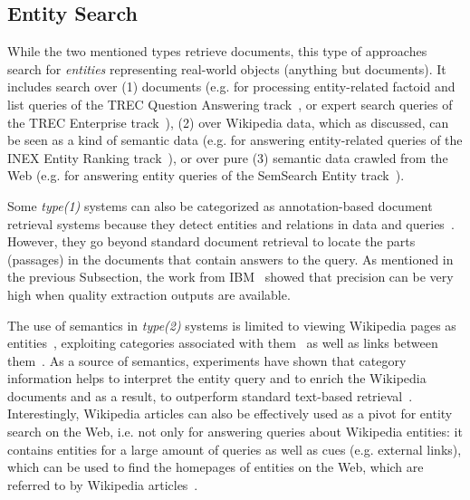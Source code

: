 \subsection{Entity Search} While the two mentioned types retrieve documents, this type of approaches search for \emph{entities} representing real-world objects (anything but documents). It includes search over (1) documents (e.g. for processing entity-related factoid and list queries of the TREC Question Answering track~\cite{DBLP:conf/sigir/Chu-CarrollPCFD06}, or expert search queries of the TREC Enterprise track~\cite{DBLP:journals/ipm/BalogAR09}), 
(2) over 
Wikipedia data, which as discussed, can be seen as a kind of semantic data (e.g. for answering entity-related queries of the INEX Entity Ranking track~\cite{DBLP:conf/cikm/KapteinSVK10,DBLP:conf/ecir/PehcevskiVT08}), or over pure (3) semantic data crawled from the Web (e.g. for answering entity queries of the SemSearch Entity track~\cite{DBLP:conf/semweb/BlancoMV11}).  

Some \emph{type(1)} systems can also be categorized as annotation-based document retrieval systems because they detect entities and relations in data and queries~\cite{DBLP:conf/vldb/ChengYC07,DBLP:conf/www/NieMSWM07,DBLP:conf/sigir/Chu-CarrollPCFD06}. However, they go beyond standard document retrieval to locate the parts (passages) in the documents that contain answers to the query. As mentioned in the previous Subsection, the work from IBM~\cite{DBLP:conf/sigir/Chu-CarrollPCFD06} showed that precision can be very high when quality extraction outputs are available. 

The use of semantics in \emph{type(2)} systems is limited to viewing Wikipedia pages as entities~\cite{DBLP:conf/cikm/KapteinSVK10}, exploiting categories associated with them~\cite{DBLP:journals/tois/BalogBR11} as well as links between them~\cite{DBLP:conf/ecir/PehcevskiVT08}. As a source of semantics, experiments have shown that category information helps to interpret the entity query and to enrich the Wikipedia documents and as a result, to outperform standard text-based retrieval~\cite{DBLP:conf/cikm/KapteinSVK10,DBLP:journals/tois/BalogBR11}. Interestingly, 
Wikipedia articles can also be effectively used as a pivot for entity search on the Web, i.e. not only for answering queries about Wikipedia entities: it contains entities for a large amount of queries as well as cues (e.g. external links), which can be used to find the homepages of entities on the Web, which are referred to by Wikipedia articles~\cite{DBLP:conf/cikm/KapteinSVK10}. 


